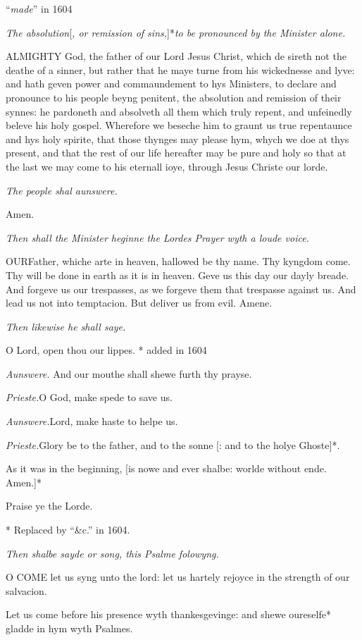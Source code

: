 ``\emph{made}''
in 1604

\emph{The
absolution}[\emph{, or remission of sins,}]*\emph{to be pronounced by
the Minister alone.}

ALMIGHTY
God, the father of our Lord Jesus Christ, which de sireth not the deathe
of a sinner, but rather that he maye turne from his wickednesse and lyve:
and hath geven power and commaundement to hys Ministers, to declare and
pronounce to his people beyng penitent, the absolution and remission of
their synnes: he pardoneth and absolveth all them which truly repent,
and unfeinedly beleve his holy gospel. Wherefore we beseche him to graunt
us true repentaunce and hys holy spirite, that those thynges may please
hym, whych we doe at thys present, and that the rest of our life hereafter
may be pure and holy so that at the last we may come to his eternall ioye,
through Jesus Christe our lorde.

\emph{The
people shal aunswere.}

Amen.

\emph{Then
shall the Minister heginne the Lordes Prayer wyth a loude voice.}

OUR\textbf{}Father, whiche arte in heaven, hallowed be thy name. Thy kyngdom come.
Thy will be done in earth as it is in heaven. Geve us this day our dayly
breade. And forgeve us our trespasses, as we forgeve them that trespasse
against us. And lead us not into temptacion. But deliver us from evil.
Amene.

\emph{Then
likewise he shall saye.}

O Lord, open thou our lippes. *
added in 1604

\emph{Aunswere.}
And our mouthe shall shewe furth thy prayse.

\emph{Prieste.}O God, make spede to save us.

\emph{Aunswere.}Lord, make haste to helpe us.

\emph{Prieste.}Glory be to the father, and to the
sonne [: and to the holye Ghoste]*.

As it was in the beginning, [is nowe and ever shalbe:
worlde without ende. Amen.]* 

Praise ye the Lorde.

*
Replaced by ``\&c.''
in 1604.

\emph{Then
shalbe sayde or song, this Psalme folowyng.}

O
COME let us syng unto the lord: let us hartely rejoyce in the strength
of our salvacion.

Let us come before his presence wyth thankesgevinge:
and shewe oureselfe* gladde in hym wyth Psalmes.

